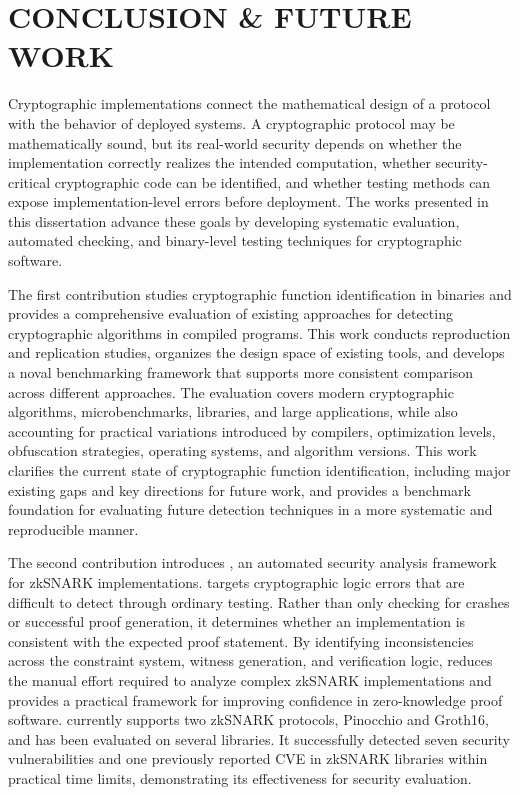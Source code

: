 \chapter{CONCLUSION \& FUTURE WORK}
\label{ch:conclusion}
Cryptographic implementations connect the mathematical design of a protocol with the behavior of deployed systems. A cryptographic protocol may be mathematically sound, but its real-world security depends on whether the implementation correctly realizes the intended computation, whether security-critical cryptographic code can be identified, and whether testing methods can expose implementation-level errors before deployment. The works presented in this dissertation advance these goals by developing systematic evaluation, automated checking, and binary-level testing techniques for cryptographic software.

The first contribution studies cryptographic function identification in binaries and provides a comprehensive evaluation of existing approaches for detecting cryptographic algorithms in compiled programs. This work conducts reproduction and replication studies, organizes the design space of existing tools, and develops a noval benchmarking framework that supports more consistent comparison across different approaches. The evaluation covers modern cryptographic algorithms, microbenchmarks, libraries, and large applications, while also accounting for practical variations introduced by compilers, optimization levels, obfuscation strategies, operating systems, and algorithm versions. This work clarifies the current state of cryptographic function identification, including major existing gaps and key directions for future work, and provides a benchmark foundation for evaluating future detection techniques in a more systematic and reproducible manner.

The second contribution introduces \snarkprobe, an automated security analysis framework for zkSNARK implementations. \snarkprobe targets cryptographic logic errors that are difficult to detect through ordinary testing. Rather than only checking for crashes or successful proof generation, it determines whether an implementation is consistent with the expected proof statement. By identifying inconsistencies across the constraint system, witness generation, and verification logic, \snarkprobe reduces the manual effort required to analyze complex zkSNARK implementations and provides a practical framework for improving confidence in zero-knowledge proof software. \snarkprobe currently supports two zkSNARK protocols, Pinocchio and Groth16, and has been evaluated on several libraries. It successfully detected seven security vulnerabilities and one previously reported CVE in zkSNARK libraries within practical time limits, demonstrating its effectiveness for security evaluation.

